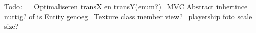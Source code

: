 Todo\+:~\newline
~\newline
 Optimaliseren transX en transY(enum?)~\newline
 M\+VC Abstract inhertince nuttig? of is Entity genoeg~\newline
 Texture class member view?~\newline
 playership foto scale size? 